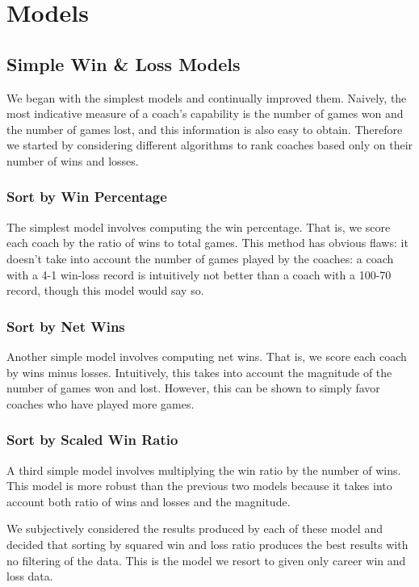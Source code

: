 \documentclass[11pt,notitlepage]{article}
\begin{document}
\section{Models}

\subsection{Simple Win \& Loss Models}

We began with the simplest models and continually improved them. Naively, the most indicative measure of a coach's capability is the number of games won and the number of games lost, and this information is also easy to obtain. Therefore we started by considering different algorithms to rank coaches based only on their number of wins and losses.

\subsubsection{Sort by Win Percentage}
The simplest model involves computing the win percentage. That is, we score each coach by the ratio of wins to total games. This method has obvious flaws: it doesn't take into account the number of games played by the coaches: a coach with a 4-1 win-loss record is intuitively not better than a coach with a 100-70 record, though this model would say so.

\subsubsection{Sort by Net Wins}
Another simple model involves computing net wins. That is, we score each coach by wins minus losses. Intuitively, this takes into account the magnitude of the number of games won and lost. However, this can be shown to simply favor coaches who have played more games. 

\subsubsection{Sort by Scaled Win Ratio}
A third simple model involves multiplying the win ratio by the number of wins. This model is more robust than the previous two models because it takes into account both ratio of wins and losses and the magnitude. 

We subjectively considered the results produced by each of these model and decided that sorting by squared win and loss ratio produces the best results with no filtering of the data. This is the model we resort to given only career win and loss data.
\end{document}
